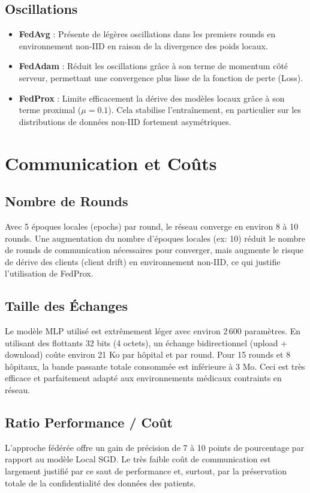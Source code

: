 \documentclass[12pt,a4paper]{article}
\begin{document}
\subsection{Oscillations}
\begin{itemize}
    \item \textbf{FedAvg} : Présente de légères oscillations dans les premiers rounds en environnement non-IID en raison de la divergence des poids locaux.
    \item \textbf{FedAdam} : Réduit les oscillations grâce à son terme de momentum côté serveur, permettant une convergence plus lisse de la fonction de perte (Loss).
    \item \textbf{FedProx} : Limite efficacement la dérive des modèles locaux grâce à son terme proximal ($\mu=0.1$). Cela stabilise l'entraînement, en particulier sur les distributions de données non-IID fortement asymétriques.
\end{itemize}

\section{Communication et Coûts}

\subsection{Nombre de Rounds}
Avec 5 époques locales (epochs) par round, le réseau converge en environ 8 à 10 rounds. Une augmentation du nombre d'époques locales (ex: 10) réduit le nombre de rounds de communication nécessaires pour converger, mais augmente le risque de dérive des clients (client drift) en environnement non-IID, ce qui justifie l'utilisation de FedProx.

\subsection{Taille des Échanges}
Le modèle MLP utilisé est extrêmement léger avec environ 2\,600 paramètres.
En utilisant des flottants 32 bits (4 octets), un échange bidirectionnel (upload + download) coûte environ 21 Ko par hôpital et par round. Pour 15 rounds et 8 hôpitaux, la bande passante totale consommée est inférieure à 3 Mo. Ceci est très efficace et parfaitement adapté aux environnements médicaux contraints en réseau.

\subsection{Ratio Performance / Coût}
L'approche fédérée offre un gain de précision de 7 à 10 points de pourcentage par rapport au modèle Local SGD. Le très faible coût de communication est largement justifié par ce saut de performance et, surtout, par la préservation totale de la confidentialité des données des patients.
\end{document}
